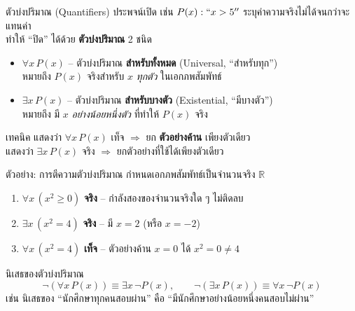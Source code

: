 \begin{frame}{ตัวบ่งปริมาณ (Quantifiers)}
  ประพจน์เปิด เช่น $P(x): ``x > 5''$ ระบุค่าความจริงไม่ได้จนกว่าจะแทนค่า \\
  ทำให้ ``ปิด'' ได้ด้วย \textbf{ตัวบ่งปริมาณ} 2 ชนิด
  \begin{block}{}
    \begin{itemize}
      \item $\forall x\,P(x)$ -- ตัวบ่งปริมาณ \textbf{สำหรับทั้งหมด} (Universal, ``สำหรับทุก'') \\
            หมายถึง $P(x)$ จริงสำหรับ $x$ \emph{ทุกตัว} ในเอกภพสัมพัทธ์
      \item $\exists x\,P(x)$ -- ตัวบ่งปริมาณ \textbf{สำหรับบางตัว} (Existential, ``มีบางตัว'') \\
            หมายถึง มี $x$ \emph{อย่างน้อยหนึ่งตัว} ที่ทำให้ $P(x)$ จริง
    \end{itemize}
  \end{block}
  \begin{alertblock}{เทคนิค}
    แสดงว่า $\forall x\,P(x)$ เท็จ $\Rightarrow$ ยก \textbf{ตัวอย่างค้าน} เพียงตัวเดียว \\
    แสดงว่า $\exists x\,P(x)$ จริง $\Rightarrow$ ยกตัวอย่างที่ใช้ได้เพียงตัวเดียว
  \end{alertblock}
\end{frame}

\begin{frame}{ตัวอย่าง: การตีความตัวบ่งปริมาณ}
  กำหนดเอกภพสัมพัทธ์เป็นจำนวนจริง $\mathbb{R}$
  \begin{enumerate}
    \item $\forall x\,(x^2 \geq 0)$ \hfill \textcolor{Tgreen}{\textbf{จริง}} -- กำลังสองของจำนวนจริงใด ๆ ไม่ติดลบ
    \item $\exists x\,(x^2 = 4)$ \hfill \textcolor{Tgreen}{\textbf{จริง}} -- มี $x=2$ (หรือ $x=-2$)
    \item $\forall x\,(x^2 = 4)$ \hfill \textcolor{Fred}{\textbf{เท็จ}} -- ตัวอย่างค้าน $x=0$ ได้ $x^2=0\neq4$
  \end{enumerate}
  \vspace{0.8em}
  \begin{block}{นิเสธของตัวบ่งปริมาณ}
    \[
      \neg(\forall x\,P(x)) \equiv \exists x\,\neg P(x), \qquad
      \neg(\exists x\,P(x)) \equiv \forall x\,\neg P(x)
    \]
    เช่น นิเสธของ ``นักศึกษาทุกคนสอบผ่าน'' คือ ``มีนักศึกษาอย่างน้อยหนึ่งคนสอบไม่ผ่าน''
  \end{block}
\end{frame}

